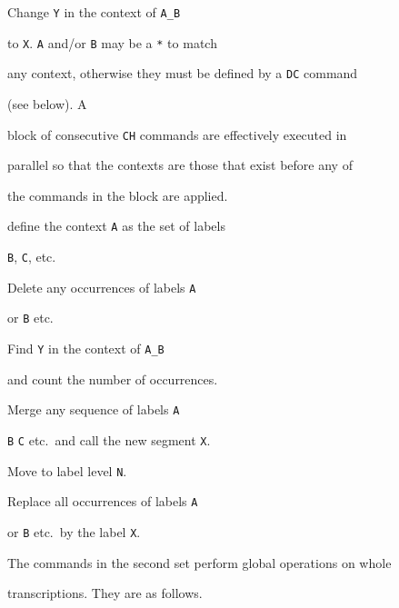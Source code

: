 \begin{varlist}


         Change \texttt{Y} in the context of \texttt{A\_B} 


      to \texttt{X}.  \texttt{A} and/or \texttt{B} may be a \texttt{*} to match 


      any context, otherwise they must be defined by a \texttt{DC} command


      (see below).  A


      block of consecutive \texttt{CH} commands are effectively executed in


      parallel so that the contexts are those that exist before any of


      the commands in the block are applied.


        define the context \texttt{A} as the set of labels


        \texttt{B}, \texttt{C}, etc.   


        Delete any occurrences of labels \texttt{A}


        or \texttt{B} etc. 


     Find \texttt{Y} in the context of \texttt{A\_B} 


      and count the number of occurrences.


        Merge any sequence of labels \texttt{A}


       \texttt{B} \texttt{C} etc.\  and call the new segment \texttt{X}.


    Move to label level \texttt{N}.


      Replace all occurrences of labels \texttt{A}


      or \texttt{B} etc.\ by the label \texttt{X}.


\end{varlist}





The commands in the second set perform global operations on whole


transcriptions.  They are as follows.





